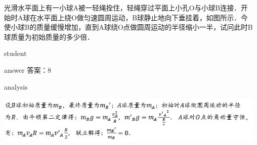\begin{example}
	 光滑水平面上有一小球A被一轻绳拴住，轻绳穿过平面上小孔O与小球B连接．开始时A球在水平面上绕O做匀速圆周运动，B球静止地向下垂挂着，如图所示．今使小球B的质量缓慢增加，直到A球绕O点做圆周运动的半径缩小一半，试问此时B球质量为初始质量的多少倍．
	
	\begin{taggedblock}{student}
		\vspace*{2cm}
	\end{taggedblock}
	
	
	\begin{taggedblock}{answer}
		答案：8
	\end{taggedblock}
	
	
	\begin{taggedblock}{analysis}
	\begin{center}
		\includegraphics[width=0.9\linewidth]{image/am-6}
	\end{center}
	
	\end{taggedblock}
\end{example}


